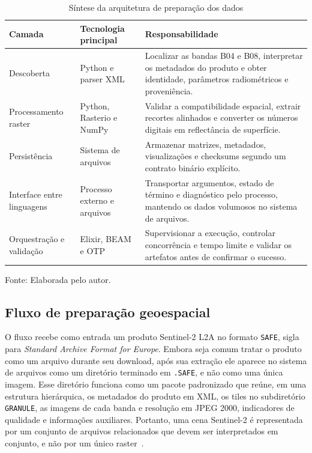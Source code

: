 \documentclass[tcc,capa]{texufpel}
\begin{document}
\begin{table}[htbp]
\centering
\caption{Síntese da arquitetura de preparação dos dados}
\label{tab:arquitetura-preparacao-dados}
\begin{tabular}{p{} p{} p{}}
\hline
\textbf{Camada} & \textbf{Tecnologia principal} & \textbf{Responsabilidade} \\
\hline
Descoberta & Python e parser XML & Localizar as bandas B04 e B08, interpretar os metadados do produto e obter identidade, parâmetros radiométricos e proveniência. \\
Processamento raster & Python, Rasterio e NumPy & Validar a compatibilidade espacial, extrair recortes alinhados e converter os números digitais em reflectância de superfície. \\
Persistência & Sistema de arquivos & Armazenar matrizes, metadados, visualizações e checksums segundo um contrato binário explícito. \\
Interface entre linguagens & Processo externo e arquivos & Transportar argumentos, estado de término e diagnóstico pelo processo, mantendo os dados volumosos no sistema de arquivos. \\
Orquestração e validação & Elixir, BEAM e OTP & Supervisionar a execução, controlar concorrência e tempo limite e validar os artefatos antes de confirmar o sucesso. \\
\hline
\end{tabular}
\begin{flushleft}
{\small Fonte: Elaborada pelo autor.}
\end{flushleft}
\end{table}

\subsection{Fluxo de preparação geoespacial}

O fluxo recebe como entrada um produto Sentinel-2 L2A no formato \texttt{SAFE},
sigla para \textit{Standard Archive Format for Europe}. Embora seja comum tratar o
produto como um arquivo durante seu download, após sua extração ele aparece no
sistema de arquivos como um diretório terminado em \texttt{.SAFE}, e não como uma
única imagem. Esse diretório funciona como um pacote padronizado que reúne, em uma
estrutura hierárquica, os metadados do produto em XML, os tiles no subdiretório
\texttt{GRANULE}, as imagens de cada banda e resolução em JPEG 2000, indicadores de
qualidade e informações auxiliares. Portanto, uma cena Sentinel-2 é representada
por um conjunto de arquivos relacionados que devem ser interpretados em conjunto,
e não por um único raster~\cite{esaSafe}.
\end{document}
